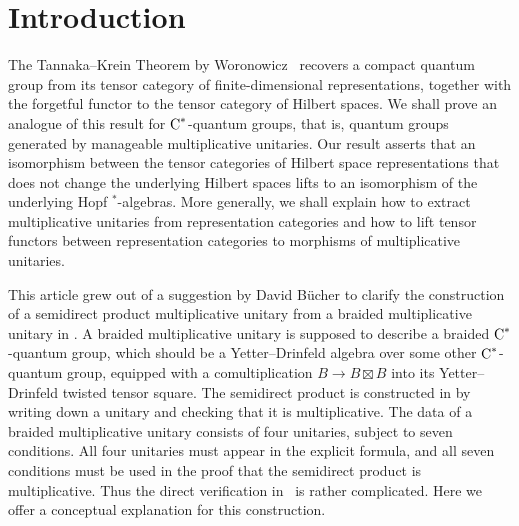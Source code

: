 \documentclass[a4paper]{amsart}
\numberwithin{equation}{section}
\theoremstyle{plain}
\numberwithin{theorem}{section}
\theoremstyle{definition}
\theoremstyle{remark}
\newcommand*{\nb}{\nobreakdash}
\newcommand*{\Star}{$^*$\nb-}
\newcommand*{\Cst}{\textup C^*}%
\begin{document}
\section{Introduction}
\label{sec:intro}

The Tannaka--Krein Theorem by Woronowicz~\cite{Woronowicz:Tannaka-Krein}
recovers a compact quantum group from its tensor category of finite-dimensional
representations, together with the forgetful functor to the tensor
category of Hilbert spaces.  We shall prove an analogue of this
result for \(\Cst\)\nb-quantum groups, that is, quantum groups
generated by manageable multiplicative unitaries.  Our result
asserts that an isomorphism between the tensor categories of Hilbert
space representations that does not change the underlying Hilbert
spaces lifts to an isomorphism of the underlying Hopf
\Star{}algebras.  More generally, we shall explain how to extract
multiplicative unitaries from representation categories and how to
lift tensor functors between representation categories to
morphisms of multiplicative unitaries.

This article grew out of a suggestion by David Bücher to clarify the
construction of a semidirect product multiplicative unitary from a
braided multiplicative unitary
in \cites{Meyer-Roy-Woronowicz:Qgrp_proj, Roy:Qgrp_with_proj}.  A
braided multiplicative
unitary is supposed to describe a braided \(\Cst\)\nb-quantum group,
which should be a Yetter--Drinfeld algebra over some other
\(\Cst\)\nb-quantum group, equipped with a comultiplication \(B\to
B\boxtimes B\) into its Yetter--Drinfeld twisted tensor square.  The
semidirect product is constructed
in \cites{Meyer-Roy-Woronowicz:Qgrp_proj, Roy:Qgrp_with_proj} by
writing down a
unitary and checking that it is multiplicative.  The data of a
braided multiplicative unitary consists of four unitaries, subject
to seven conditions.  All four unitaries must appear in the explicit
formula, and all seven conditions must be used in the proof that the
semidirect product is multiplicative.  Thus the direct verification
in~\cite{Meyer-Roy-Woronowicz:Qgrp_proj} is rather complicated.
Here we offer a conceptual explanation for this construction.
\end{document}
